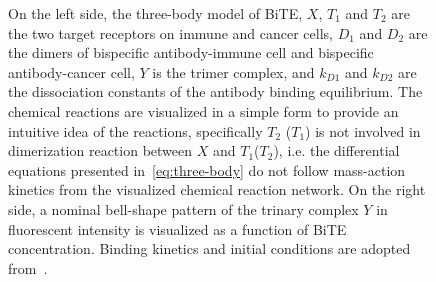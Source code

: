 \begin{figure}[!hb]
	\caption[Three-body model]{On the left side, the three-body model of \ac{BiTE}, $X$, $T_1$ and $T_2$ are the two target receptors on immune and cancer cells, $D_1$ and $D_2$ are the dimers of bispecific antibody-immune cell and bispecific antibody-cancer cell, $Y$ is the trimer complex, and $k_{D1}$ and $k_{D2}$ are the dissociation constants of the antibody binding equilibrium. The chemical reactions are visualized in a simple form to provide an intuitive idea of the reactions, specifically $T_2$ ($T_1$) is not involved in dimerization reaction between $X$ and $T_1$($T_2$), i.e. the differential equations presented in~\eqref{eq:three-body} do not follow mass-action kinetics from the visualized chemical reaction network. On the right side, a nominal bell-shape pattern of the trinary complex $Y$ in fluorescent intensity is visualized as a function of \ac{BiTE} concentration. Binding kinetics and initial conditions are adopted from~\cite{betts2019translational}. }
	\label{fig:three-body}
\end{figure}

